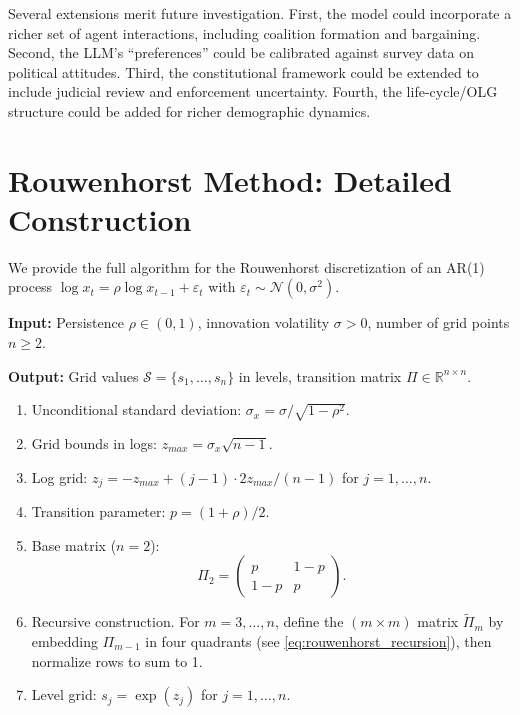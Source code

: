 \documentclass[12pt]{article}
\newcommand{\R}{\mathbb{R}}
\newcommand{\calS}{\mathcal{S}}
\begin{document}
Several extensions merit future investigation. First, the model could incorporate a richer set of agent interactions, including coalition formation and bargaining. Second, the LLM's ``preferences'' could be calibrated against survey data on political attitudes. Third, the constitutional framework could be extended to include judicial review and enforcement uncertainty. Fourth, the life-cycle/OLG structure could be added for richer demographic dynamics.


\appendix

\section{Rouwenhorst Method: Detailed Construction}\label{app:rouwenhorst}

We provide the full algorithm for the Rouwenhorst discretization of an AR(1) process $\log x_t = \rho \log x_{t-1} + \varepsilon_t$ with $\varepsilon_t \sim \mathcal{N}(0, \sigma^2)$.

\textbf{Input:} Persistence $\rho \in (0, 1)$, innovation volatility $\sigma > 0$, number of grid points $n \geq 2$.

\textbf{Output:} Grid values $\calS = \{s_1, \ldots, s_n\}$ in levels, transition matrix $\Pi \in \R^{n \times n}$.

\begin{enumerate}
  \item Unconditional standard deviation: $\sigma_x = \sigma / \sqrt{1 - \rho^2}$.
  \item Grid bounds in logs: $z_{max} = \sigma_x \sqrt{n-1}$.
  \item Log grid: $z_j = -z_{max} + (j-1) \cdot 2z_{max}/(n-1)$ for $j = 1, \ldots, n$.
  \item Transition parameter: $p = (1 + \rho)/2$.
  \item Base matrix ($n = 2$):
  \[
    \Pi_2 = \begin{pmatrix} p & 1-p \\ 1-p & p \end{pmatrix}.
  \]
  \item Recursive construction. For $m = 3, \ldots, n$, define the $(m \times m)$ matrix $\widetilde{\Pi}_m$ by embedding $\Pi_{m-1}$ in four quadrants (see \eqref{eq:rouwenhorst_recursion}), then normalize rows to sum to 1.
  \item Level grid: $s_j = \exp(z_j)$ for $j = 1, \ldots, n$.
\end{enumerate}
\end{document}

